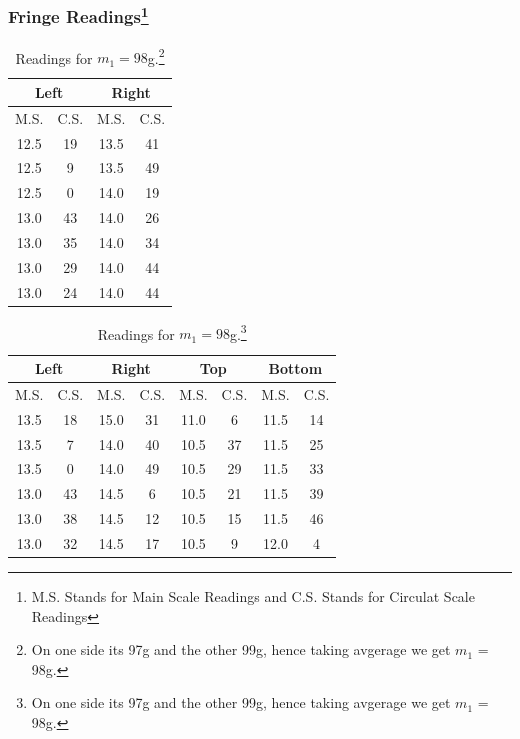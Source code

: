 \documentclass[%
sor,
jor,
 amsmath,amssymb,
 reprint,
longbibliography,
]{revtex4-2}
\begin{document}
\subsubsection{Fringe Readings\footnote{M.S. Stands for Main Scale Readings and C.S. Stands for Circulat Scale Readings}}
\begin{table}[H]
    \centering
    \begin{minipage}[t]{0.48\textwidth}
        \centering
\begin{tabular}{|c|c|c|c|}
\hline
\multicolumn{2}{|c|}{Left} & \multicolumn{2}{c|}{Right}\\
\hline
M.S. & C.S. & M.S. & C.S. \\
\hline
12.5 & 19 & 13.5 & 41 \\
12.5 & 9  & 13.5 & 49 \\
12.5 & 0  & 14.0 & 19 \\
13.0 & 43 & 14.0 & 26 \\
13.0 & 35 & 14.0 & 34 \\
13.0 & 29 & 14.0 & 44 \\
13.0 & 24 & 14.0 & 44 \\
\hline
\end{tabular}
\caption{Readings for $m_1=0$g.}

            \end{minipage}%
    \hfill %
    \begin{minipage}[t]{0.48\textwidth}
        \centering
\begin{tabular}{|c|c|c|c|c|c|c|c|}
\hline
\multicolumn{2}{|c|}{Left} & \multicolumn{2}{c|}{Right}  & \multicolumn{2}{c|}{Top} & \multicolumn{2}{c|}{Bottom}  \\
\hline
M.S. & C.S. & M.S. & C.S. & M.S. & C.S. & M.S. & C.S. \\ 
\hline
13.5 & 18 & 15.0 & 31 & 11.0 & 6  & 11.5 & 14 \\
13.5 & 7  & 14.0 & 40 & 10.5 & 37 & 11.5 & 25 \\
13.5 & 0  & 14.0 & 49 & 10.5 & 29 & 11.5 & 33 \\
13.0 & 43 & 14.5 & 6  & 10.5 & 21 & 11.5 & 39 \\
13.0 & 38 & 14.5 & 12 & 10.5 & 15 & 11.5 & 46 \\
13.0 & 32 & 14.5 & 17 & 10.5 & 9  & 12.0 & 4  \\
\hline
\end{tabular}
\caption{Readings for $m_1=98$g.\footnote{On one side its 97g and the other 99g, hence taking avgerage we get $m_1$ = 98g.}}

            \end{minipage}
\end{table}
\end{document}
